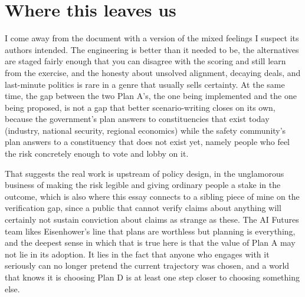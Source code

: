 \documentclass[11pt,letterpaper]{article}
\begin{document}
\section{Where this leaves us}

I come away from the document with a version of the mixed feelings I suspect its authors intended. The engineering is better than it needed to be, the alternatives are staged fairly enough that you can disagree with the scoring and still learn from the exercise, and the honesty about unsolved alignment, decaying deals, and last-minute politics is rare in a genre that usually sells certainty. At the same time, the gap between the two Plan A's, the one being implemented and the one being proposed, is not a gap that better scenario-writing closes on its own, because the government's plan answers to constituencies that exist today (industry, national security, regional economics) while the safety community's plan answers to a constituency that does not exist yet, namely people who feel the risk concretely enough to vote and lobby on it.

That suggests the real work is upstream of policy design, in the unglamorous business of making the risk legible and giving ordinary people a stake in the outcome, which is also where this essay connects to a sibling piece of mine on the verification gap, since a public that cannot verify claims about anything will certainly not sustain conviction about claims as strange as these. The AI Futures team likes Eisenhower's line that plans are worthless but planning is everything, and the deepest sense in which that is true here is that the value of Plan A may not lie in its adoption. It lies in the fact that anyone who engages with it seriously can no longer pretend the current trajectory was chosen, and a world that knows it is choosing Plan D is at least one step closer to choosing something else.
\end{document}
